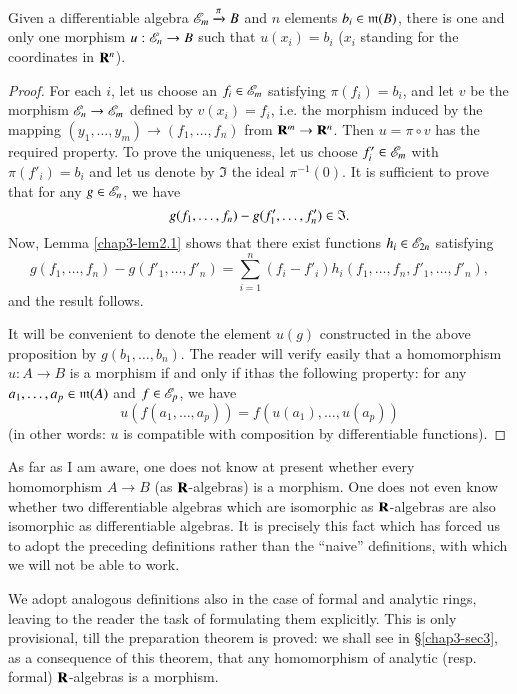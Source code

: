 \begin{proposition}\label{chap3-prop2.3}
Given a differentiable algebra $\mathscr{E}_{m}\xrightarrow{\pi}B$ and $n$ elements $b_{i}\in \mathfrak{m}(B)$, there is one and only one morphism $u:\mathscr{E}_{n}\to B$ such that $u(x_{i})=b_{i}$ ($x_{i}$ standing for the coordinates in $\mathbf{R}^{n}$).
\end{proposition}

\begin{proof}
For each $i$, let us choose an $f_{i}\in \mathscr{E}_{m}$ satisfying $\pi(f_{i})=b_{i}$, and let $v$ be the morphism $\mathscr{E}_{n}\to \mathscr{E}_{m}$ defined by $v(x_{i})=f_{i}$, i.e. the morphism induced by the mapping $(y_{1},\ldots,y_{m})\to (f_{1},\ldots,f_{n})$ from $\mathbf{R}^{m}\to \mathbf{R}^{n}$. Then $u=\pi\circ v$ has the required property. To prove the uniqueness, let us choose $f'_{i}\in \mathscr{E}_{m}$ with $\pi(f'_{i})=b_{i}$ and let us denote by $\mathfrak{I}$ the ideal $\pi^{-1}(0)$. It is sufficient to prove that for any $g\in \mathscr{E}_{n}$, we have
$$
g(f_{1},\ldots,f_{n})-g(f'_{1},\ldots,f'_{n})\in \mathfrak{I}.
$$
Now, Lemma \ref{chap3-lem2.1} shows that there exist functions $h_{i}\in \mathscr{E}_{2n}$ satisfying
$$
g(f_{1},\ldots,f_{n})-g(f'_{1},\ldots,f'_{n})=\sum\limits^{n}_{i=1}(f_{i}-f'_{i})h_{i}(f_{1},\ldots,f_{n},f'_{1},\ldots,f'_{n}),
$$
and the result follows.

\vfill\eject

It will be convenient to denote the element $u(g)$ constructed in the above proposition by $g(b_{1},\ldots,b_{n})$. The reader will verify easily that a homomorphism $u:A\to B$ is a morphism if and only if it\pageoriginale has the following property: for any $a_{1},\ldots,a_{p}\in \mathfrak{m}(A)$ and $f\in\mathscr{E}_{p}$, we have
$$
u(f(a_{1},\ldots,a_{p}))=f(u(a_{1}),\ldots,u(a_{p}))
$$
(in other words: $u$ is compatible with composition by differentiable functions).
\end{proof}

\begin{remark}\label{chap3-rem2.4}
As far as I am aware, one does not know at present whether every homomorphism $A\to B$ (as $\mathbf{R}$-algebras) is a morphism. One does not even know whether two differentiable algebras which are isomorphic as $\mathbf{R}$-algebras are also isomorphic as differentiable algebras. It is precisely this fact which has forced us to adopt the preceding definitions rather than the ``naive'' definitions, with which we will not be able to work.

We adopt analogous definitions also in the case of formal and analytic rings, leaving to the reader the task of formulating them explicitly. This is only provisional, till the preparation theorem is proved: we shall see in \S\ref{chap3-sec3}, as a consequence of this theorem, that any homomorphism of analytic (resp. formal) $\mathbf{R}$-algebras is a morphism.
\end{remark}


